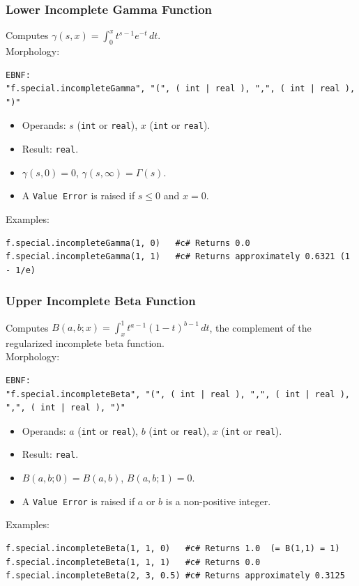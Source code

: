 \subsubsection{Lower Incomplete Gamma Function}
Computes $\gamma(s, x) = \int_0^x t^{s-1} e^{-t}\,dt$. \\
Morphology:
\begin{verbatim}
EBNF:
"f.special.incompleteGamma", "(", ( int | real ), ",", ( int | real ), ")"
\end{verbatim}
\begin{itemize}
\item Operands: $s$ (\texttt{int} or \texttt{real}), $x$ (\texttt{int} or \texttt{real}).
\item Result: \texttt{real}.
\item $\gamma(s, 0) = 0$, $\gamma(s, \infty) = \Gamma(s)$.
\item A \texttt{Value Error} is raised if $s \leq 0$ and $x = 0$.
\end{itemize}
Examples:
\begin{verbatim}
f.special.incompleteGamma(1, 0)   #c# Returns 0.0
f.special.incompleteGamma(1, 1)   #c# Returns approximately 0.6321 (1 - 1/e)
\end{verbatim}

\subsubsection{Upper Incomplete Beta Function}
Computes $B(a, b; x) = \int_x^1 t^{a-1} (1-t)^{b-1}\,dt$, the complement of the regularized incomplete beta function. \\
Morphology:
\begin{verbatim}
EBNF:
"f.special.incompleteBeta", "(", ( int | real ), ",", ( int | real ), ",", ( int | real ), ")"
\end{verbatim}
\begin{itemize}
\item Operands: $a$ (\texttt{int} or \texttt{real}), $b$ (\texttt{int} or \texttt{real}), $x$ (\texttt{int} or \texttt{real}).
\item Result: \texttt{real}.
\item $B(a, b; 0) = B(a, b)$, $B(a, b; 1) = 0$.
\item A \texttt{Value Error} is raised if $a$ or $b$ is a non-positive integer.
\end{itemize}
Examples:
\begin{verbatim}
f.special.incompleteBeta(1, 1, 0)   #c# Returns 1.0  (= B(1,1) = 1)
f.special.incompleteBeta(1, 1, 1)   #c# Returns 0.0
f.special.incompleteBeta(2, 3, 0.5) #c# Returns approximately 0.3125
\end{verbatim}

